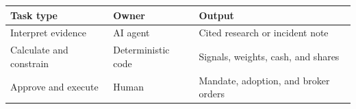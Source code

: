 \begin{tabular}{@{}P{3.0cm}P{4.6cm}P{4.9cm}@{}}
\toprule
\textbf{Task type} & \textbf{Owner} & \textbf{Output} \\
\midrule
Interpret evidence & AI agent & Cited research or incident note \\
Calculate and constrain & Deterministic code & Signals, weights, cash, and shares \\
Approve and execute & Human & Mandate, adoption, and broker orders \\
\bottomrule
\end{tabular}
